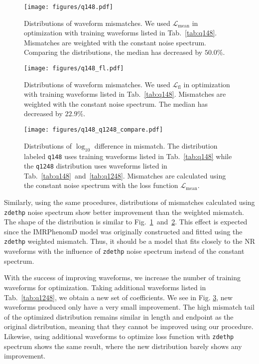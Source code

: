 \documentclass[twocolumn]{aastex631}
\newcommand{\zdethp}{\texttt{zdethp}}
\begin{document}

\begin{figure}[t]
	\centering
	\texttt{[image: figures/q148.pdf]}
	\caption{Distributions of waveform mismatches. We used $\mathcal{L}_{\mathrm{mean}}$ in optimization with training waveforms listed in Tab.~\ref{tab:q148}. Mismatches are weighted with the constant noise spectrum. Comparing the distributions, the median has decreased by $50.0\%$.}
	\label{fig:q148}
\end{figure}
\begin{figure}[t]
	\centering
	\texttt{[image: figures/q148\_fl.pdf]}
	\caption{Distributions of waveform mismatches. We used $\mathcal{L}_{\mathrm{fl}}$ in optimization with training waveforms listed in Tab.~\ref{tab:q148}. Mismatches are weighted with the constant noise spectrum. The median has decreased by $22.9\%$.}
	\label{fig:q148_fl}
\end{figure}
\begin{figure}[t]
	\centering
	\texttt{[image: figures/q148\_q1248\_compare.pdf]}
	\caption{Distributions of $\log_{10}$ difference in mismatch. The distribution labeled \texttt{q148} uses training waveforms listed in Tab.~\ref{tab:q148} while the \texttt{q1248} distribution uses waveforms listed in Tab.~\ref{tab:q148}~and~\ref{tab:q1248}. Mismatches are calculated using the constant noise spectrum with the loss function $\mathcal{L}_{\mathrm{mean}}$.}
	\label{fig:q148_q1248_compare}
\end{figure}

Similarly, using the same procedures, distributions of mismatches calculated using {\zdethp} noise spectrum show better improvement than the weighted mismatch. The shape of the distribution is similar to Fig.~\ref{fig:q148}~and~\ref{fig:q148_fl}. This effect is expected since the IMRPhenomD model was originally constructed and fitted using the {\zdethp} weighted mismatch. Thus, it should be a model that fits closely to the NR waveforms with the influence of {\zdethp} noise spectrum instead of the constant spectrum. 

With the success of improving waveforms, we increase the number of training waveforms for optimization. Taking additional waveforms listed in Tab.~\ref{tab:q1248}, we obtain a new set of coefficients. We see in Fig. \ref{fig:q148_q1248_compare}, new waveforms produced only have a very small improvement. The high mismatch tail of the optimized distribution remains similar in length and endpoint as the original distribution, meaning that they cannot be improved using our procedure. Likewise, using additional waveforms to optimize loss function with {\zdethp} spectrum shows the same result, where the new distribution barely shows any improvement. 
\end{document}
